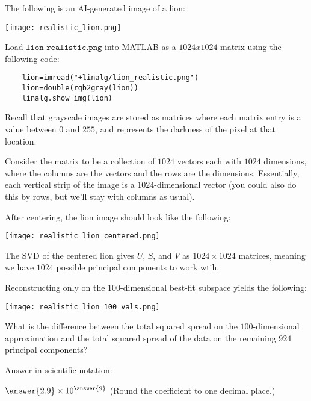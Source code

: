 \documentclass{ximera}
\begin{document}
\begin{problem}

  The following is an AI-generated image of a lion:

  \begin{center}

      \texttt{[image: realistic\_lion.png]}

  \end{center}

  Load $\texttt{lion\_realistic.png}$ into MATLAB as a $1024x1024$ matrix using the following code:

  \begin{verbatim}
    lion=imread("+linalg/lion_realistic.png")
    lion=double(rgb2gray(lion))
    linalg.show_img(lion)
  \end{verbatim}

  Recall that grayscale images are stored as matrices where each matrix entry is a value between $0$ and $255$, and represents the darkness of the pixel at that location.

  Consider the matrix to be a collection of $1024$ vectors each with $1024$ dimensions, where the columns are the vectors and the rows are the dimensions. Essentially, each vertical strip of the image is a $1024$-dimensional vector (you could also do this by rows, but we'll stay with columns as usual).

  After centering, the lion image should look like the following:

  \begin{center}

    \texttt{[image: realistic\_lion\_centered.png]}

\end{center}

The SVD of the centered lion gives $U$, $S$, and $V$ as $1024\times 1024$ matrices, meaning we have $1024$ possible principal components to work wtih. 

Reconstructing only on the $100$-dimensional best-fit subspace yields the following:

\begin{center}

  \texttt{[image: realistic\_lion\_100\_vals.png]}

\end{center}

What is the difference between the total squared spread on the $100$-dimensional approximation and the total squared spread of the data on the remaining $924$ principal components? 

Answer in scientific notation:

$\answer{2.9}\times 10^{\answer{9}}$ (Round the coefficient to one decimal place.)

\end{problem}
\end{document}

